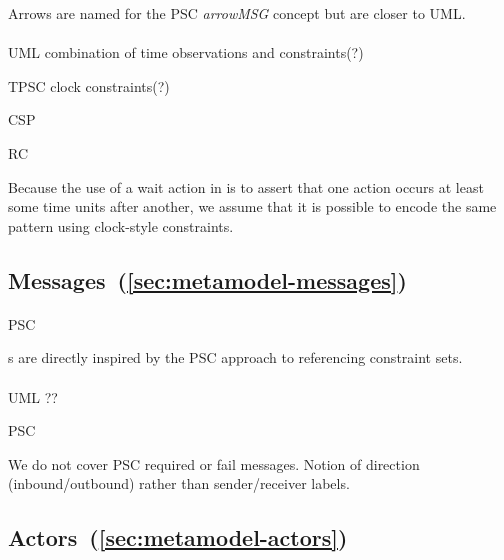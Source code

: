 Arrows are named for the PSC \emph{arrowMSG} concept but are closer
to UML.
      
\paragraph{\mwaitaction}
\begin{featset}
\item[UML] combination of time observations and constraints(?)
\item[TPSC] clock constraints(?)
\item[CSP] 
\item[RC] 
\end{featset}

Because the use of a wait action in \langname{} is to assert that one
action occurs at least some time units after another, we assume that it is
possible to encode the same pattern using clock-style constraints.

\subsection{Messages~(\ref{sec:metamodel-messages})}

\paragraph{\mmessageset}
\begin{featset}
\item[PSC] 
\end{featset}

\mrefmessageset s are directly inspired by the PSC approach to referencing constraint sets.

\paragraph{\mmessagespec}
\begin{featset}
\item[UML] ??
\item[PSC] 
\end{featset}

We do not cover PSC required or fail messages.
Notion of direction (inbound/outbound) rather than sender/receiver labels.

\subsection{Actors~(\ref{sec:metamodel-actors})}

